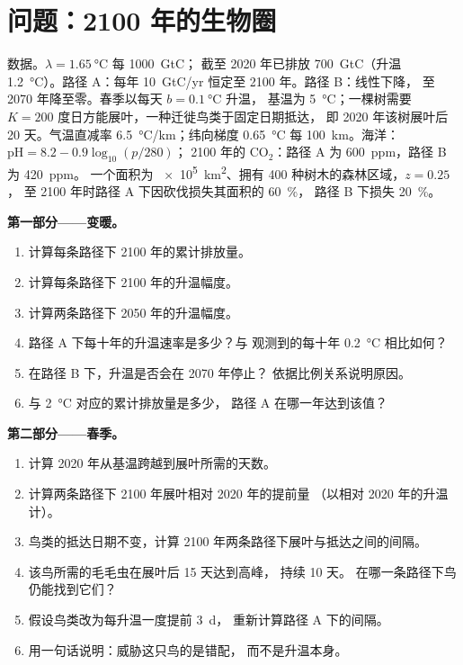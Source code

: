 \section{问题：2100 年的生物圈}

\begin{problem}
\label{pb:b2:global-change:1}
数据。$\lambda = \qty{1.65}{\celsius}$ 每 \qty{1000}{GtC}；
截至 2020 年已排放 \qty{700}{GtC}（升温 \qty{1.2}{\celsius}）。路径
A：每年 \qty{10}{GtC/yr} 恒定至 2100 年。路径 B：线性下降，
至 2070 年降至零。春季以每天 $b = \qty{0.1}{\celsius}$ 升温，
基温为 \qty{5}{\celsius}；一棵树需要 $K = 200$
度日方能展叶，一种迁徙鸟类于固定日期抵达，
即 2020 年该树展叶后 20 天。气温直减率
\qty{6.5}{\celsius/km}；纬向梯度 \qty{0.65}{\celsius}
每 \qty{100}{km}。海洋：$\mathrm{pH} = 8.2 - 0.9\log_{10}(p/280)$；
2100 年的 \ensuremath{\mathrm{CO_2}}：路径 A 为 \qty{600}{ppm}，路径 B 为 \qty{420}{ppm}。
一个面积为 \qty{e5}{km^2}、拥有 400 种树木的森林区域，$z = 0.25$，
至 2100 年时路径 A 下因砍伐损失其面积的 \qty{60}{\%}，
路径 B 下损失 \qty{20}{\%}。

\medskip
\noindent\textbf{第一部分——变暖。}
\begin{enumerate}
  \item 计算每条路径下 2100 年的累计排放量。
  \item 计算每条路径下 2100 年的升温幅度。
  \item 计算两条路径下 2050 年的升温幅度。
  \item 路径 A 下每十年的升温速率是多少？与
        观测到的每十年 \qty{0.2}{\celsius} 相比如何？
  \item 在路径 B 下，升温是否会在 2070 年停止？
        依据比例关系说明原因。
  \item 与 \qty{2}{\celsius} 对应的累计排放量是多少，
        路径 A 在哪一年达到该值？
\end{enumerate}

\medskip
\noindent\textbf{第二部分——春季。}
\begin{enumerate}[resume]
  \item 计算 2020 年从基温跨越到展叶所需的天数。
  \item 计算两条路径下 2100 年展叶相对 2020 年的提前量
        （以相对 2020 年的升温计）。
  \item 鸟类的抵达日期不变，计算
        2100 年两条路径下展叶与抵达之间的间隔。
  \item 该鸟所需的毛毛虫在展叶后 15 天达到高峰，
        持续 10 天。
        在哪一条路径下鸟仍能找到它们？
  \item 假设鸟类改为每升温一度提前 \qty{3}{d}，
        重新计算路径 A 下的间隔。
  \item 用一句话说明：威胁这只鸟的是错配，
        而不是升温本身。
\end{enumerate}


\end{problem}
